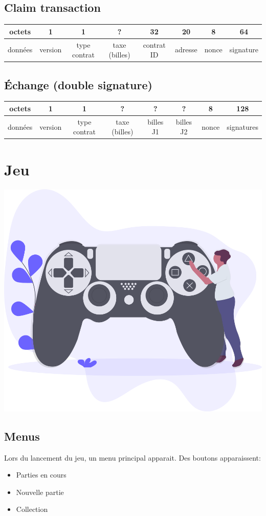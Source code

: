\documentclass{article}
\begin{document}
\subsection{Claim transaction}
\hspace*{-1cm}%
\begin{tabular}{ |c|c|c|c|c|c|c|c|} 
 \hline
 octets & 1 & 1 & ? & 32 & 20 & 8 & 64 \\ 
 \hline
    données & version & type contrat & taxe (billes) & contrat ID & adresse & nonce & signature\\ 
 \hline
\end{tabular}

\subsection{Échange (double signature)}
\hspace*{-1cm}%
\begin{tabular}{ |c|c|c|c|c|c|c|c|} 
 \hline
 octets & 1 & 1 & ? & ? & ? & 8 & 128\\ 
 \hline
    données & version & type contrat & taxe (billes) & billes J1 & billes J2 & nonce & signatures\\ 
 \hline
\end{tabular}

\newpage

\section{Jeu}
\includegraphics[width=0.3\linewidth]{assets/gaming.png}\\
\subsection{Menus}

Lors du lancement du jeu, un menu principal apparait. Des boutons apparaissent:
\begin{itemize}
    \item Parties en cours
    \item Nouvelle partie
    \item Collection
\end{itemize}
\end{document}

